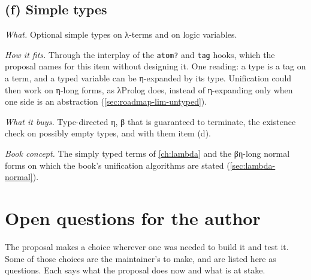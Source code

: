 \subsection{(f) Simple types}\label{sec:roadmap-later-types}

\emph{What.} Optional simple types on λ-terms and on logic variables.

\emph{How it fits.} Through the interplay of the \texttt{atom?} and \texttt{tag} hooks, which the proposal
names for this item without designing it. One reading: a type is a tag on a term, and a typed variable can
be η-expanded by its type. Unification could then work on η-long forms,
as λProlog does, instead of η-expanding only when one side is an abstraction
(\cref{sec:roadmap-lim-untyped}).

\emph{What it buys.} Type-directed η, β that is guaranteed to terminate, the existence check on
possibly empty types, and with them item (d).

\emph{Book concept.} The simply typed terms of \cref{ch:lambda} and the βη-long normal forms on which
the book's unification algorithms are stated (\cref{sec:lambda-normal}).

\section{Open questions for the author}\label{sec:roadmap-questions}

The proposal makes a choice wherever one was needed to build it and test it. Some of those choices are
the maintainer's to make, and are listed here as questions. Each says what the proposal does now and
what is at stake.

